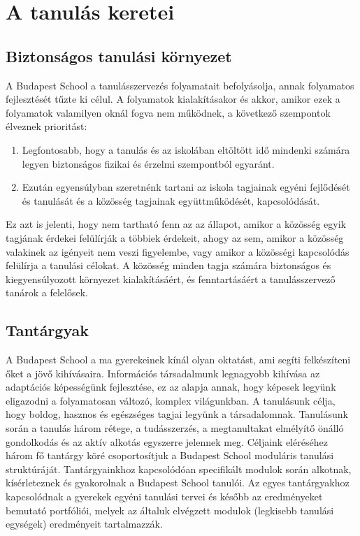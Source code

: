\chapter{A tanulás keretei}


\section{Biztonságos tanulási környezet}

A Budapest School a tanulásszervezés folyamatait befolyásolja, annak folyamatos fejlesztését tűzte ki célul. A folyamatok kialakításakor és akkor, amikor ezek a folyamatok valamilyen oknál fogva nem működnek, a következő szempontok élveznek prioritást:

\begin{enumerate}

\item Legfontosabb, hogy a tanulás és az iskolában eltöltött idő mindenki számára legyen biztonságos fizikai és érzelmi szempontból egyaránt.

\item Ezután egyensúlyban szeretnénk tartani az iskola  tagjainak egyéni fejlődését és tanulását és a közösség tagjainak együttműködését, kapcsolódását.

\end{enumerate}
Ez azt is jelenti, hogy nem tartható fenn az az állapot, amikor a közösség egyik tagjának érdekei felülírják a többiek érdekeit, ahogy az sem, amikor a közösség valakinek az igényeit nem veszi figyelembe, vagy amikor a közösségi kapcsolódás felülírja a tanulási célokat. A közösség minden tagja számára biztonságos és kiegyensúlyozott környezet kialakításáért, és fenntartásáért a tanulásszervező tanárok a felelősek.

\section{Tantárgyak}
\label{sec:tantargyak}
A Budapest School a ma gyerekeinek kínál olyan oktatást, ami segíti felkészíteni őket a jövő kihívásaira. Információs társadalmunk legnagyobb kihívása az adaptációs képességünk fejlesztése, ez az alapja annak, hogy képesek legyünk eligazodni a folyamatosan változó, komplex világunkban. A tanulásunk célja, hogy boldog, hasznos és egészséges tagjai legyünk a társadalomnak. Tanulásunk során a tanulás három rétege, a tudásszerzés, a megtanultakat elmélyítő önálló gondolkodás és az aktív alkotás egyszerre jelennek meg. Céljaink eléréséhez három fő tantárgy köré csoportosítjuk a Budapest School moduláris tanulási struktúráját. Tantárgyainkhoz kapcsolódóan specifikált modulok során alkotnak, kísérleteznek és gyakorolnak a Budapest School tanulói. Az egyes tantárgyakhoz kapcsolódnak a gyerekek egyéni tanulási tervei és később az eredményeket bemutató portfóliói, melyek az általuk elvégzett modulok (legkisebb tanulási egységek) eredményeit tartalmazzák.

